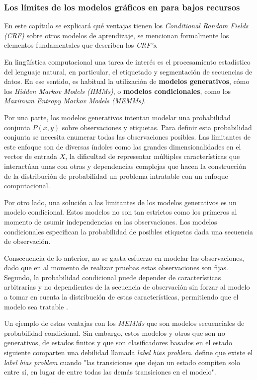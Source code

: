 \documentclass[letterpaper,12pt,oneside]{book}
\theoremstyle{definition}
\begin{document}
\subsubsection{Los límites de los modelos gráficos en para bajos recursos}

En este capítulo se explicará qué ventajas tienen los \emph{Conditional Random Fields (CRF)} sobre otros modelos de aprendizaje, se mencionan formalmente los elementos fundamentales que describen los \emph{CRF's}.

En lingüística computacional una tarea de interés es el procesamiento estadístico del lenguaje natural, en particular, el etiquetado y segmentación de secuencias de datos. En ese sentido, es habitual la utilización de \textbf{modelos generativos}, cómo los \textit{Hidden Markov Models (HMMs)}, o \textbf{modelos condicionales}, como los \textit{Maximum Entropy Markov Models (MEMMs)}.

Por una parte, los modelos generativos intentan modelar una probabilidad conjunta $P(x,y)$ sobre observaciones y etiquetas. Para definir esta probabilidad conjunta se necesita enumerar todas las observaciones posibles. Las limitantes de este enfoque son de diversas índoles como las grandes dimensionalidades en el vector de entrada $X$, la dificultad de representar múltiples características que interactúan unas con otras y dependencias complejas que hacen la construcción de la distribución de probabilidad un problema intratable con un enfoque computacional.

Por otro lado, una solución a las limitantes de los modelos generativos es un modelo condicional. Estos modelos no son tan estrictos como los primeros al momento de asumir independencias en las observaciones. Los modelos condicionales especifican la probabilidad de posibles etiquetas dada una secuencia de observación.

Consecuencia de lo anterior, no se gasta esfuerzo en modelar las observaciones, dado que en al momento de realizar pruebas estas observaciones son fijas. Segundo, la probabilidad condicional puede depender de características arbitrarias y no dependientes de la secuencia de observación sin forzar al modelo a tomar en cuenta la distribución de estas características, permitiendo que el modelo sea tratable \citep{lafferty2001conditional}.

Un ejemplo de estas ventajas con los \textit{MEMMs} que son modelos secuenciales de probabilidad condicional. Sin embargo, estos modelos y otros que son no generativos, de estados finitos y que son clasificadores basados en el estado siguiente comparten una debilidad llamada \emph{label bias problem}. \citet{lafferty2001conditional} define que existe el \emph{label bias problem} cuando "las transiciones que dejan un estado compiten solo entre sí, en lugar de entre todas las demás transiciones en el modelo".
\end{document}
